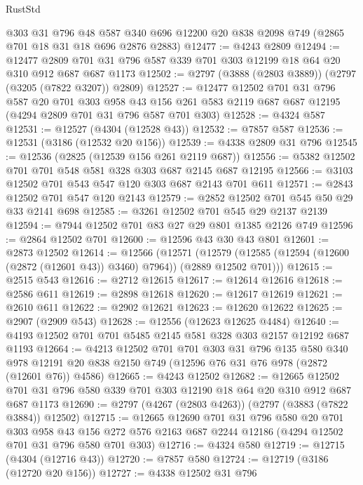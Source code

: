 \begin{lexlean}{RustStd}
\begin{coremodule}
{\begin{coremodule}
{{{{{{{{{{{{{{{{{{{{    @303
    @31
    @796
    @48
    @587
    @340
    @696
    @12200
    @20
    @838
    @2098
    @749
    (@2865 @701 @18 @31 @18 @696 @2876 @2883)
@12477 := @4243 @2809
@12494 := @12477
    @2809
    @701
    @31
    @796
    @587
    @339
    @701
    @303
    @12199
    @18
    @64
    @20
    @310
    @912
    @687
    @687
    @1173
@12502 := @2797 (@3888 (@2803 @3889)) (@2797 (@3205 (@7822 @3207)) @2809)
@12527 := @12477
    @12502
    @701
    @31
    @796
    @587
    @20
    @701
    @303
    @958
    @43
    @156
    @261
    @583
    @2119
    @687
    @687
    @12195
    (@4294 @2809 @701 @31 @796 @587 @701 @303)
@12528 := @4324 @587
@12531 := @12527 (@4304 (@12528 @43))
@12532 := @7857 @587
@12536 := @12531 (@3186 (@12532 @20 @156))
@12539 := @4338 @2809 @31 @796
@12545 := @12536 (@2825 (@12539 @156 @261 @2119 @687))
@12556 := @5382 @12502 @701 @701 @548 @581 @328 @303 @687 @2145 @687 @12195
@12566 := @3103 @12502 @701 @543 @547 @120 @303 @687 @2143 @701 @611
@12571 := @2843 @12502 @701 @547 @120 @2143
@12579 := @2852 @12502 @701 @545 @50 @29 @33 @2141 @698
@12585 := @3261 @12502 @701 @545 @29 @2137 @2139
@12594 := @7944 @12502 @701 @83 @27 @29 @801 @1385 @2126 @749
@12596 := @2864 @12502 @701
@12600 := @12596 @43 @30 @43 @801
@12601 := @2873 @12502
@12614 := @12566
    (@12571
      (@12579 (@12585 (@12594 (@12600 (@2872 (@12601 @43)) @3460) @7964)) (@2889 @12502 @701)))
@12615 := @2515 @543
@12616 := @2712 @12615
@12617 := @12614 @12616
@12618 := @2586 @611
@12619 := @2898 @12618
@12620 := @12617 @12619
@12621 := @2610 @611
@12622 := @2902 @12621
@12623 := @12620 @12622
@12625 := @2907 (@2909 @543)
@12628 := @12556 (@12623 @12625 @4484)
@12640 := @4193 @12502 @701 @701 @5485 @2145 @581 @328 @303 @2157 @12192 @687 @1193
@12664 := @4213
    @12502
    @701
    @701
    @303
    @31
    @796
    @135
    @580
    @340
    @978
    @12191
    @20
    @838
    @2150
    @749
    (@12596 @76 @31 @76 @978 (@2872 (@12601 @76)) @4586)
@12665 := @4243 @12502
@12682 := @12665
    @12502
    @701
    @31
    @796
    @580
    @339
    @701
    @303
    @12190
    @18
    @64
    @20
    @310
    @912
    @687
    @687
    @1173
@12690 := @2797 (@4267 (@2803 @4263)) (@2797 (@3883 (@7822 @3884)) @12502)
@12715 := @12665
    @12690
    @701
    @31
    @796
    @580
    @20
    @701
    @303
    @958
    @43
    @156
    @272
    @576
    @2163
    @687
    @2244
    @12186
    (@4294 @12502 @701 @31 @796 @580 @701 @303)
@12716 := @4324 @580
@12719 := @12715 (@4304 (@12716 @43))
@12720 := @7857 @580
@12724 := @12719 (@3186 (@12720 @20 @156))
@12727 := @4338 @12502 @31 @796
}}}}}}}}}}}}}}}}}}}}
\end{coremodule}}
\end{coremodule}
\end{lexlean}

